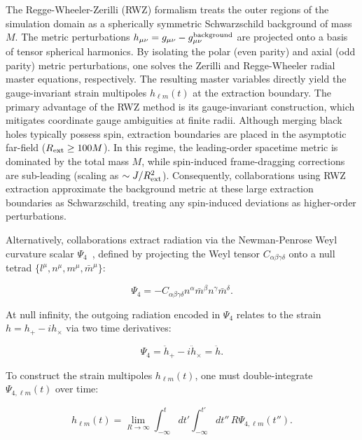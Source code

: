 \documentclass[%
 reprint,
superscriptaddress,
 amsmath,amssymb,
 aps,
]{revtex4-2}
\begin{document}
The Regge-Wheeler-Zerilli (RWZ) formalism treats the outer regions of the simulation domain as a spherically symmetric Schwarzschild background of mass $M$. The metric perturbations $h_{\mu\nu} = g_{\mu\nu} - g^{\rm background}_{\mu\nu}$ are projected onto a basis of tensor spherical harmonics. By isolating the polar (even parity) and axial (odd parity) metric perturbations, one solves the Zerilli and Regge-Wheeler radial master equations, respectively. The resulting master variables directly yield the gauge-invariant strain multipoles $h_{\ell m}(t)$ at the extraction boundary. The primary advantage of the RWZ method is its gauge-invariant construction, which mitigates coordinate gauge ambiguities at finite radii. Although merging black holes typically possess spin, extraction boundaries are placed in the asymptotic far-field ($R_{\rm ext} \ge 100M$). In this regime, the leading-order spacetime metric is dominated by the total mass $M$, while spin-induced frame-dragging corrections are sub-leading (scaling as $\sim J/R_{\rm ext}^2$). Consequently, collaborations using RWZ extraction approximate the background metric at these large extraction boundaries as Schwarzschild, treating any spin-induced deviations as higher-order perturbations. 

Alternatively, collaborations extract radiation via the Newman-Penrose Weyl curvature scalar $\Psi_4$~\cite{Newman:1963vrk, Teukolsky:1973ha, Newman:1965tw}, defined by projecting the Weyl tensor $C_{\alpha\beta\gamma\delta}$ onto a null tetrad $\{l^\mu, n^\mu, m^\mu, \bar{m}^\mu\}$:

\begin{equation}\Psi_4 = -C_{\alpha\beta\gamma\delta} n^\alpha \bar{m}^\beta n^\gamma \bar{m}^\delta.\end{equation}

At null infinity, the outgoing radiation encoded in $\Psi_4$ relates to the strain $h = h_+ - i h_\times$ via two time derivatives:

\begin{equation}\Psi_4 = \ddot{h}_+ - i \ddot{h}_\times = \ddot{h}.\end{equation}

To construct the strain multipoles $h_{\ell m}(t)$, one must double-integrate $\Psi_{4,\ell m}(t)$ over time:

\begin{equation}h_{\ell m}(t) = \lim_{R \to \infty} \int_{-\infty}^t dt' \int_{-\infty}^{t'} dt'' \, R \Psi_{4,\ell m}(t'').\end{equation}
\end{document}
